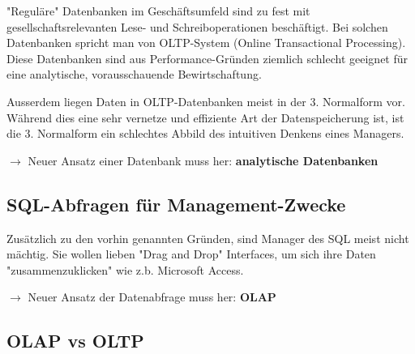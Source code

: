 \documentclass[a4paper, 11pt]{article}
\begin{document}
"Reguläre" Datenbanken im Geschäftsumfeld sind zu fest mit gesellschaftsrelevanten Lese- und Schreiboperationen beschäftigt. Bei solchen Datenbanken spricht man von OLTP-System (Online Transactional Processing). Diese Datenbanken sind aus Performance-Gründen ziemlich schlecht geeignet für eine analytische, vorausschauende Bewirtschaftung.

Ausserdem liegen Daten in OLTP-Datenbanken meist in der 3. Normalform vor. Während dies eine sehr vernetze und effiziente Art der Datenspeicherung ist, ist die 3. Normalform ein schlechtes Abbild des intuitiven Denkens eines Managers.

$\rightarrow$ Neuer Ansatz einer Datenbank muss her: \textbf{analytische Datenbanken}

\subsection{SQL-Abfragen für Management-Zwecke}
Zusätzlich zu den vorhin genannten Gründen, sind Manager des SQL meist nicht mächtig. Sie wollen lieben "Drag and Drop" Interfaces, um sich ihre Daten "zusammenzuklicken" wie z.b. Microsoft Access.

$\rightarrow$ Neuer Ansatz der Datenabfrage muss her: \textbf{OLAP}

\subsection{OLAP vs OLTP}
\end{document}
